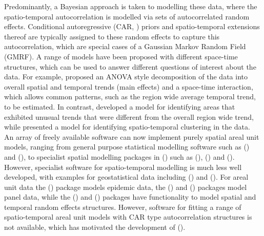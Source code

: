 \documentclass[article, nojss]{jss}
\begin{document}
Predominantly, a Bayesian approach is taken to modelling these data, where the spatio-temporal autocorrelation is modelled via sets of autocorrelated random effects. Conditional autoregressive (CAR, \citealp{besag1991}) priors and spatio-temporal extensions thereof  are typically assigned to these random effects to capture this autocorrelation, which are special cases of a Gaussian Markov Random Field (GMRF). A range of models have been proposed with different space-time structures, which can be used to answer different questions of interest about the data. For example, \cite{knorrheld2000} proposed an ANOVA style decomposition of the data into overall spatial and temporal trends (main effects) and a space-time interaction, which allows common patterns, such as the region wide average temporal trend, to be estimated. In contrast, \cite{li2012} developed a model for identifying areas that exhibited unusual trends that were different from the overall region wide trend, while \cite{lee2016} presented a model for identifying spatio-temporal clustering in the data.\\


An array of freely available software can now implement purely spatial areal unit models, ranging from general purpose statistical modelling software such as  (\citealp{lunn2009}) and  (\citealp{rue2009}), to specialist spatial modelling packages in  (\citealp{R})  such as  (\citealp{lee2013}),  (\citealp{schabenberger2009}) and  (\citealp{bivand2015}). However, specialist software for spatio-temporal modelling is much less well developed, with examples for geostatistical data including  (\citealp{JSSv063i15}) and  (\citealp{JSSv063i13}). For areal unit data the  (\citealp{paul2016}) package models epidemic data, the  (\citealp{JSSv027i02}) and  (\citealp{millo2012}) packages model panel data, while the  (\citealp{pinheiro2015}) and  (\citealp{JSSv067i01}) packages have functionality to model spatial and temporal random effects structures. However, software for fitting a range of spatio-temporal areal unit models with CAR type autocorrelation structures is not available, which has  motivated the development of  (\citealp{lee2018}).\\
\end{document}
